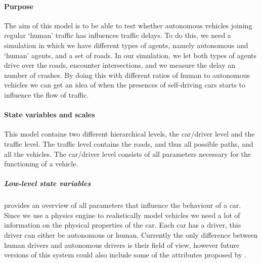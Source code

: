 \paragraph{Purpose}
\label{par:method:model:overview:purpose}
The aim of this model is to be able to test whether autonomous vehicles joining regular `human' traffic has influences traffic delays. To do this, we need a simulation in which we have different types of agents, namely autonomous and `human' agents, and a set of roads. In our simulation, we let both types of agents drive over the roads, encounter intersections, and we  measure the delay an number of crashes. By doing this with different ratios of human to autonomous vehicles we can get an idea of when the presences of self-driving cars starts to influence the flow of traffic.

\paragraph{State variables and scales}
\label{par:method:model:overview:state}
This model contains two different hierarchical levels, the car/driver level and the traffic level. The traffic level contains the roads, and thus all possible paths, and all the vehicles. The car/driver level consists of all parameters necessary for the functioning of a vehicle.  

\subparagraph{Low-level state variables}
 provides an overview of all parameters that influence the behaviour of a car. Since we use a physics engine to realistically model vehicles we need a lot of information on the physical properties of the car. Each car has a driver, this driver can either be autonomous or human. Currently the only difference between human drivers and autonomous drivers is their field of view, however future versions of this system could also include some of the attributes proposed by \citeauthor{paruchuri2002multi}. 

